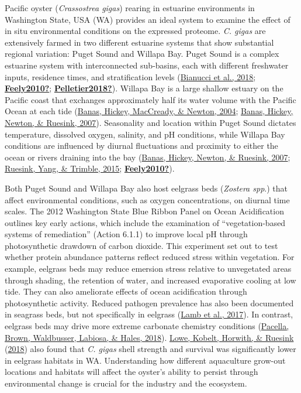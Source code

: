 \documentclass [11pt, proquest] {uwthesis}[2015/03/03]
\begin{document}
Pacific oyster (\emph{Crassostrea gigas}) rearing in estuarine environments in Washington State, USA (WA) provides an ideal system to examine the effect of in situ environmental conditions on the expressed proteome. \emph{C. gigas} are extensively farmed in two different estuarine systems that show substantial regional variation: Puget Sound and Willapa Bay. Puget Sound is a complex estuarine system with interconnected sub-basins, each with different freshwater inputs, residence times, and stratification levels (\protect\hyperlink{ref-Bianucci2018}{Bianucci et al., 2018}; \protect\hyperlink{ref-Feely2010}{\textbf{Feely2010?}}; \protect\hyperlink{ref-Pelletier2018}{\textbf{Pelletier2018?}}). Willapa Bay is a large shallow estuary on the Pacific coast that exchanges approximately half its water volume with the Pacific Ocean at each tide (\protect\hyperlink{ref-Banas2004}{Banas, Hickey, MacCready, \& Newton, 2004}; \protect\hyperlink{ref-Banas2007}{Banas, Hickey, Newton, \& Ruesink, 2007}). Seasonality and location within Puget Sound dictates temperature, dissolved oxygen, salinity, and pH conditions, while Willapa Bay conditions are influenced by diurnal fluctuations and proximity to either the ocean or rivers draining into the bay (\protect\hyperlink{ref-Banas2007}{Banas, Hickey, Newton, \& Ruesink, 2007}; \protect\hyperlink{ref-Ruesink2015}{Ruesink, Yang, \& Trimble, 2015}; \protect\hyperlink{ref-Feely2010}{\textbf{Feely2010?}}).

Both Puget Sound and Willapa Bay also host eelgrass beds (\emph{Zostera spp}.) that affect environmental conditions, such as oxygen concentrations, on diurnal time scales. The 2012 Washington State Blue Ribbon Panel on Ocean Acidification outlines key early actions, which include the examination of ``vegetation-based systems of remediation'' (Action 6.1.1) to improve local pH through photosynthetic drawdown of carbon dioxide. This experiment set out to test whether protein abundance patterns reflect reduced stress within vegetation. For example, eelgrass beds may reduce emersion stress relative to unvegetated areas through shading, the retention of water, and increased evaporative cooling at low tide. They can also ameliorate effects of ocean acidification through photosynthetic activity. Reduced pathogen prevalence has also been documented in seagrass beds, but not specifically in eelgrass (\protect\hyperlink{ref-Lamb2017}{Lamb et al., 2017}). In contrast, eelgrass beds may drive more extreme carbonate chemistry conditions (\protect\hyperlink{ref-Pacella2018}{Pacella, Brown, Waldbusser, Labiosa, \& Hales, 2018}). \protect\hyperlink{ref-Lowe2018}{Lowe, Kobelt, Horwith, \& Ruesink} (\protect\hyperlink{ref-Lowe2018}{2018}) also found that \emph{C. gigas} shell strength and survival was significantly lower in eelgrass habitats in WA. Understanding how different aquaculture grow-out locations and habitats will affect the oyster's ability to persist through environmental change is crucial for the industry and the ecosystem.
\end{document}
